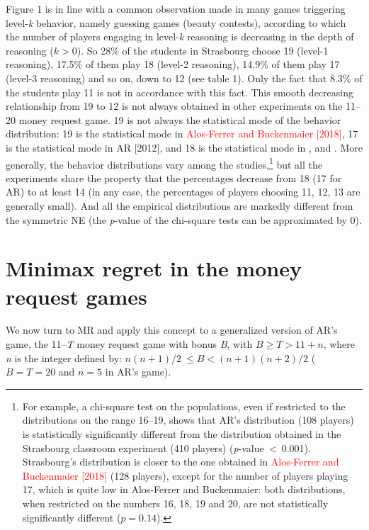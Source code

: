 \begin{Article}
\begin{refsection}[Umbhauer]
Figure 1 is in line with a common observation made in many games
triggering level-\emph{k} behavior, namely guessing games (beauty
contests), according to which the number of players engaging in
level-\emph{k} reasoning is decreasing in the depth of reasoning
(\(k > 0\)). So 28\% of the students in Strasbourg choose 19 (level-1
reasoning), 17.5\% of them play 18 (level-2 reasoning), 14.9\% of them
play 17 (level-3 reasoning) and so on, down to 12 (see table 1). Only
the fact that 8.3\% of the students play 11 is not in accordance with
this fact. This smooth decreasing relationship from 19 to 12 is not
always obtained in other experiments on the 11--20 money request game.
19 is not always the statistical mode of the behavior distribution: 19
is the statistical mode in \textcolor{red}{Alos-Ferrer and Buckenmaier [2018]}, 17 is
the statistical mode in AR {[}2012{]}, and 18 is the statistical mode in \textcite{goeree2018}, \textcite{li2018} and \textcite{lindner2013}. More generally, the behavior distributions vary among the studies,\footnote{For example, a chi-square test on the populations, even if restricted to the distributions on the range 16--19, shows that AR's distribution (108 players) is statistically significantly different from the distribution obtained in the Strasbourg classroom experiment (410 players) (\emph{p}-value~<~0.001). Strasbourg's
  distribution is closer to the one obtained in \textcolor{red}{Alos-Ferrer and  Buckenmaier {[}2018{]}} (128 players), except for the number of players
  playing 17, which is quite low in Alos-Ferrer and Buckenmaier: both
  distributions, when restricted on the numbers 16, 18, 19 and 20, are
  not statistically significantly different (\(p = 0.14\)).} but all the
experiments share the property that the percentages decrease from 18 (17
for AR) to at least 14 (in any case, the percentages of players choosing
11, 12, 13 are generally small). And all the empirical distributions are
markedly different from the symmetric NE (the \emph{p}-value of the
chi-square tests can be approximated by 0).

\section{Minimax regret in the money request games}
\label{section:Minimax regret in the money}

We now turn to MR and apply this concept to a generalized version of
AR's game, the 11--\emph{T} money request game with bonus \emph{B}, with
\(B \geq T > 11 + n\), where \emph{n} is the integer defined by:
\(n(n + 1)/2\  \leq B < (n + 1)(n + 2)/2\) (\(B = T = 20\) and \(n = 5\)
in AR's game).


\end{refsection}
\end{Article}

